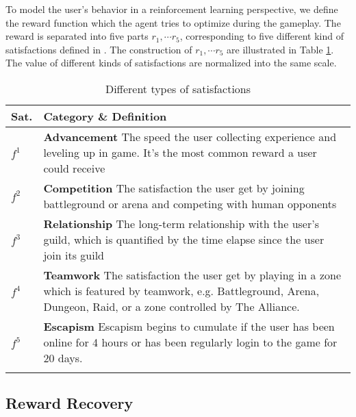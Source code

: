 \documentclass{sigchi}
\begin{document}
To model the user's behavior in a reinforcement learning perspective, we define the reward function which the agent tries to optimize during the gameplay. The reward is separated into five parts $r_1,\cdots r_5$, corresponding to five different kind of satisfactions defined in \cite{yee2006motivations}. The construction of $r_1,\cdots r_5$ are illustrated in Table \ref{tbl:satisfactions}. The value of different kinds of satisfactions are normalized into the same scale.

\begin{table}
\caption{Different types of satisfactions}
\begin{tabularx}{\textwidth}{lX}
    Sat. & \textbf{Category} \& Definition \\
    \midrule
    $f^1$ & \textbf{Advancement} The speed the user collecting experience and leveling up in game. It's the most common reward a user could receive \\
    $f^2$ & \textbf{Competition} The satisfaction the user get by joining battleground or arena and competing with human opponents \\
    $f^3$ & \textbf{Relationship} The long-term relationship with the user's guild, which is quantified by the time elapse since the user join its guild \\
    $f^4$ & \textbf{Teamwork} The satisfaction the user get by playing in a zone which is featured by teamwork, e.g. Battleground, Arena, Dungeon, Raid, or a zone controlled by The Alliance. \\
    $f^5$ & \textbf{Escapism} Escapism begins to cumulate if the user has been online for 4 hours or has been regularly login to the game for 20 days. \\
    \label{tbl:satisfactions}
\end{tabularx}
\end{table}

\subsection{Reward Recovery}
\end{document}
